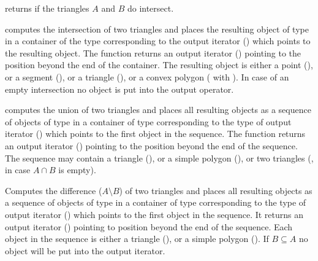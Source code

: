 

{ returns  if the triangles $A$ and $B$ do intersect.}

{computes the intersection of two triangles and places the
resulting object of type 
in a container of the type corresponding to the 
output iterator ()  which
points to the resulting object. The function returns
an output iterator () pointing to the position
beyond the end of the container. 
The resulting object is either
 a point (),
or a segment (),
or a triangle (),
or a convex polygon ( with 
).  In case of an empty intersection
no object is put into the output operator.}

{computes the union of two triangles and 
places all
resulting objects as a sequence of objects of type 
in a container of type corresponding to the type of
 output iterator () 
 which points to the first object in the
sequence. 
The function returns an output iterator () 
pointing to the position beyond the end of the sequence.
The sequence may contain
 a triangle (),
or a simple polygon (),
 or two triangles (, in case $A \cap B$ is empty).
}

{Computes the difference ($A \setminus B$) of two triangles and
 places all
resulting objects as a sequence of objects of type 
in a container of type corresponding to the type of
 output iterator () 
 which points to the first object in the
sequence.
It returns an output iterator () 
pointing to position beyond the end of the sequence.
Each object in the sequence is either a triangle
(), or
 a simple polygon ().
 If $B \subseteq A$ no object will be put into the output iterator.
}


